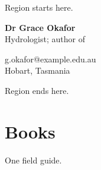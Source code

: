 \documentclass[10pt,a4paper]{article}
\begin{document}
Region starts here.

\noindent
\begin{minipage}[b]{0.65\linewidth}
{\huge\bfseries Dr Grace Okafor}\\[2pt]
Hydrologist; author of \textcite{Okafor2021}
\end{minipage}\hfill
\begin{minipage}[b]{0.33\linewidth}
\raggedleft
g.okafor@example.edu.au\\
Hobart, Tasmania
\end{minipage}

Region ends here.

\section{Books}
One field guide.

\printbibliography
\end{document}

